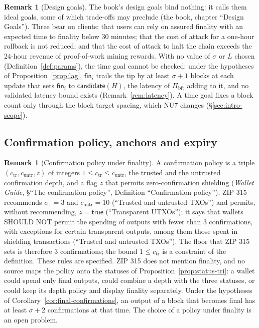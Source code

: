 \documentclass[11pt,a4paper]{article}
\theoremstyle{definition}
\newtheorem{remark}[theorem]{Remark}
\newcommand{\bft}{\mathrm{bft}}
\newcommand{\Pibft}{\Pi_{\bft}}
\newcommand{\candidate}{\mathsf{candidate}}
\newcommand{\fin}{\mathsf{fin}}
\newcommand{\ctr}{c_{\mathrm{tr}}}
\newcommand{\cuntr}{c_{\mathrm{untr}}}
\begin{document}
\begin{remark}[Design goals]\label{rem:goals}
The book's design goals bind nothing: it calls them ideal goals, some of
which trade-offs may preclude (the book, chapter ``Design Goals''). Three
bear on clients: that users can rely on assured finality with an expected
time to finality below $30$ minutes; that the cost of attack for a one-hour
rollback is not reduced; and that the cost of attack to halt the chain
exceeds the $24$-hour revenue of proof-of-work mining rewards. With no value of
$\sigma$ or $L$ chosen (Definition~\ref{def:params}), the time goal cannot be
checked: under the hypotheses of Proposition~\ref{prop:lag}, $\fin_i$ trails the
tip by at least $\sigma + 1$ blocks at each update that sets $\fin_i$ to
$\candidate(H)$, the latency of $\Pibft$ adding to it, and no validated latency
bound exists (Remark~\ref{rem:latency}). A time goal fixes a block count only
through the block target spacing, which NU7 changes (\S\ref{sec:intro-scope}).
\end{remark}

\subsection{Confirmation policy, anchors and expiry}\label{sec:k-wallet}

\begin{remark}[Confirmation policy under finality]\label{rem:policy}
A confirmation policy is a triple $(\ctr, \cuntr, z)$ of integers $1 \le
\ctr \le \cuntr$, the trusted and the untrusted confirmation depth, and a
flag $z$ that permits zero-confirmation shielding (\emph{Wallet Guide},
\S``The confirmation policy'', Definition ``Confirmation policy''). ZIP 315
recommends $\ctr = 3$ and $\cuntr = 10$ (``Trusted and untrusted TXOs'') and
permits, without recommending, $z = \mathsf{true}$ (``Transparent UTXOs'');
it says that wallets SHOULD NOT permit the spending of outputs with fewer
than $3$ confirmations, with exceptions for certain transparent outputs,
among them those spent in shielding transactions (``Trusted and untrusted
TXOs''). The floor that ZIP 315 sets is therefore $3$ confirmations; the
bound $1 \le \ctr$ is a constraint of the definition. These rules are
specified. ZIP 315 does not mention finality, and no source maps the policy
onto the statuses of Proposition~\ref{prop:status-tri}: a wallet could spend
only final outputs, could combine a depth with the three statuses, or could
keep its depth policy and display finality separately. Under the hypotheses
of Corollary~\ref{cor:final-confirmations}, an output of a block that
becomes final has at least $\sigma + 2$ confirmations at that time. The
choice of a policy under finality is an open problem.
\end{remark}
\end{document}
